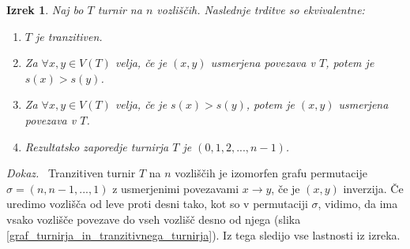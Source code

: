 \documentclass[a4paper, 12pt]{book}
\newtheorem{izrek}{Izrek}[chapter]
\newenvironment{dokaz}{\emph{Dokaz.}\ }{\hspace{\fill}{$\Box$}}
\begin{document}
\begin{izrek}
\label{izrek_tranzitiven_turnir}
    Naj bo $T$ turnir na $n$ vozliščih. Naslednje trditve so ekvivalentne:
    \begin{enumerate}
        \item $T$ je tranzitiven.
        \item Za $\forall x,y \in V(T)$ velja, če je $(x, y)$ usmerjena povezava v $T$, potem je $s(x) > s(y)$.
        \item Za $\forall x,y \in V(T)$  velja, če je $s(x) > s(y)$, potem je $(x, y)$ usmerjena povezava v $T$.
        \item Rezultatsko zaporedje turnirja $T$ je $(0, 1, 2, ..., n-1)$.
    \end{enumerate}
\end{izrek}
\begin{dokaz}
    Tranzitiven turnir $T$ na $n$ vozliščih je izomorfen grafu permutacije $\sigma = (n, n-1, ..., 1)$ z usmerjenimi povezavami $x \rightarrow y$, če je $(x, y)$ inverzija. Če uredimo vozlišča od leve proti desni tako, kot so v permutaciji $\sigma$, vidimo, da ima vsako vozlišče povezave do vseh vozlišč desno od njega (slika \ref{graf_turnirja_in_tranzitivnega_turnirja}). Iz tega sledijo vse lastnosti iz izreka.
\end{dokaz}
\end{document}
